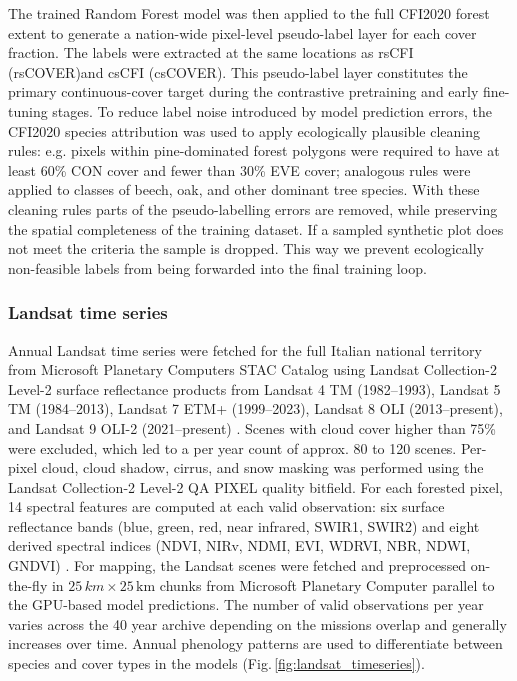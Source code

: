 \documentclass[essd, manuscript]{copernicus}
\begin{document}
The trained Random Forest model was then applied to the full CFI2020 forest extent to generate a nation-wide pixel-level pseudo-label layer for each cover fraction. The labels were extracted at the same locations as rsCFI (rsCOVER)and csCFI (csCOVER). This pseudo-label layer constitutes the primary continuous-cover target during the contrastive pretraining and early fine-tuning stages. To reduce label noise introduced by model prediction errors, the CFI2020 species attribution was used to apply ecologically plausible cleaning rules: e.g. pixels within pine-dominated forest polygons were required to have at least 60\% CON cover and fewer than 30\% EVE cover; analogous rules were applied to classes of beech, oak, and other dominant tree species. With these cleaning rules parts of the pseudo-labelling errors are removed, while preserving the spatial completeness of the training dataset. If a sampled synthetic plot does not meet the criteria the sample is dropped. This way we prevent ecologically non-feasible labels from being forwarded into the final training loop. 


\subsubsection{Landsat time series}
\label{sec:landsat}

Annual Landsat time series were fetched for the full Italian national territory from Microsoft Planetary Computers STAC Catalog using Landsat Collection-2 Level-2 surface reflectance products from Landsat 4 TM (1982–1993), Landsat 5 TM (1984–2013), Landsat 7 ETM+ (1999–2023), Landsat 8 OLI (2013–present), and Landsat 9 OLI-2 (2021–present) . Scenes with cloud cover higher than 75\% were excluded, which led to a per year count of approx. 80 to 120 scenes. Per-pixel cloud, cloud shadow, cirrus, and snow masking was performed using the Landsat Collection-2 Level-2 QA PIXEL quality bitfield.
For each forested pixel, 14 spectral features are computed at each valid observation: six surface reflectance bands (blue, green, red, near infrared, SWIR1, SWIR2) and eight derived spectral indices (NDVI, NIRv, NDMI, EVI, WDRVI, NBR, NDWI, GNDVI) \citep{montero_standardized_2023}. 
For mapping, the Landsat scenes were fetched and preprocessed on-the-fly in $25\,\unit{km} \times 25\,\text{km}$ chunks from Microsoft Planetary Computer parallel to the GPU-based model predictions. The number of valid observations per year varies across the 40 year archive depending on the missions overlap and generally increases over time. Annual phenology patterns are used to differentiate between species and cover types in the models (Fig.\,\ref{fig:landsat_timeseries}).  
\end{document}
